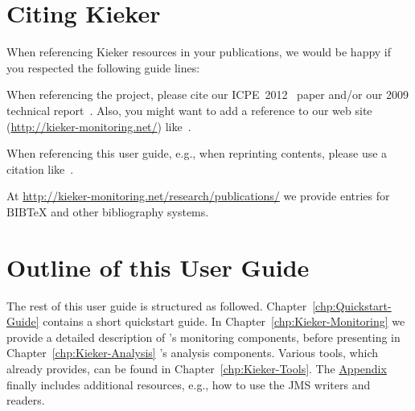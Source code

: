 	\section{Citing Kieker}\label{sec:ch1:citingKieker}
		When referencing Kieker resources in your publications, we would be happy if you respected the following guide lines:

		\begin{compactitem}
			\item 
			When referencing the \Kieker{} project, please cite our ICPE~2012~\cite{KiekerICPE2012} paper and/or our 2009 technical report~\cite{vanHoornRohrHasselbringWallerEhlersFreyKieselhorst2009TRContinuousMonitoringOfSoftwareServicesDesignAndApplicationOfTheKiekerFramework}. Also, you might want to add a reference to our web site (\url{http://kieker-monitoring.net/}) like~\cite{KiekerWebSite}. 
			\item 
			When referencing this user guide, e.g., when reprinting contents, please use a citation like~\cite{Kieker1.7UserGuide}.
		\end{compactitem}

		\noindent At \url{http://kieker-monitoring.net/research/publications/} we provide entries for $\mathrm{B\scriptstyle IB}\!$\TeX{} and other bibliography systems.
		
	\section{Outline of this User Guide}
		The rest of this user guide is structured as followed. Chapter~\ref{chp:Quickstart-Guide} contains a short quickstart guide. In Chapter~\ref{chp:Kieker-Monitoring} we provide a detailed description of \Kieker{}'s monitoring components, before presenting in Chapter~\ref{chp:Kieker-Analysis} \Kieker{}'s analysis components. Various tools, which \Kieker{} already provides, can be found in Chapter~\ref{chp:Kieker-Tools}. The \hyperlink{hypertarget:appendix}{Appendix} finally includes additional resources, e.g., how to use the JMS writers and readers.